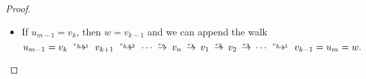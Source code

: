\begin{proof}
\begin{itemize}
    \begin{figure}[!ht]
      \begin{equation}\label{eq:fig:thm:connected_graph_cycle_removal}
        \begin{aligned}
          \texttt{[image: output/thm\_\_connected\_graph\_cycle\_removal]}
        \end{aligned}
      \end{equation}
      \caption{A detour around the highlighted edge \( e_2 \) as in the proof of \cref{thm:connected_graph_cycle_removal}}\label{fig:thm:connected_graph_cycle_removal}
    \end{figure}

    \item If \( u_{m-1} = v_k \), then \( w = v_{k-1} \) and we can append the walk
    \begin{equation*}
      u_{m-1} = v_k \reloset {e_{k+1}} \to v_{k+1} \reloset {e_{k+2}} \to \cdots \reloset {e_n} \to v_n \reloset {e_1} \to v_1 \reloset {e_2} \to v_2 \reloset {e_3} \to \cdots \reloset {e_{k-1}} \to v_{k-1} = u_m = w.
    \end{equation*}
  \end{itemize}
\end{proof}

